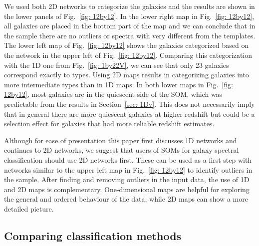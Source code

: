     
        We used both 2D networks to categorize the  galaxies and the results are shown in the lower panels of Fig.~\ref{fig: 12by12}.
        In the lower right map in Fig.~\ref{fig: 12by12}, all galaxies are placed in the bottom part of the map and we can conclude that in the  sample there are no outliers or spectra with very different from the  templates.
        The lower left map of Fig.~\ref{fig: 12by12} shows the  galaxies categorized based on the network in the upper left of Fig.~\ref{fig: 12by12}. 
        Comparing this categorization with the 1D one from Fig.~\ref{fig: 1by22V}, we can see that only 23 galaxies correspond exactly to  types.
        Using 2D maps results in categorizing galaxies into more intermediate types than in 1D maps.
        In both lower maps in Fig.~\ref{fig: 12by12}, most galaxies are in the quiescent side of the SOM, which was predictable from the results in Section~\ref{sec: 1Dv}.
        This does not necessarily imply that in general there are more quiescent galaxies at higher redshift but could be a selection effect for galaxies that had more reliable redshift estimates.
        
    Although for ease of presentation this paper first discusses 1D networks and continues to 2D networks, we suggest that users of SOMs for galaxy spectral classification should use 2D networks first.
         These can be used as a first step with networks similar to the upper left map in Fig.~\ref{fig: 12by12} to identify outliers in the sample.
        After finding and removing outliers in the input data, the use of 1D and 2D maps is complementary.
        One-dimensional maps are helpful for exploring the general and ordered behaviour of the data, while 2D maps can show a more detailed picture.
 
 
\subsection{Comparing classification methods}
    \label{sec: Kmeansvssomvsann}
   
